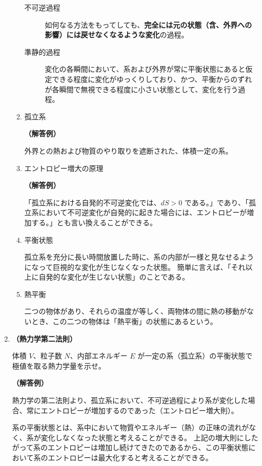 \documentclass[uplatex,dvipdfmx,a4paper,11pt]{jsarticle}
\begin{document}
\begin{appendix}
\begin{enumerate}
\begin{enumerate}
\begin{description}
\item[不可逆過程]
如何なる方法をもってしても、{\bf 完全には元の状態（含、外界への影響）には戻せなくなるような変化}の過程。

\item[準静的過程]
変化の各瞬間において、系および外界が常に平衡状態にあると仮定できる程度に変化がゆっくりしており、かつ、平衡からのずれが各瞬間で無視できる程度に小さい状態として、変化を行う過程。
\end{description}

\item
孤立系

{\bf （解答例）} 

外界との熱および物質のやり取りを遮断された、体積一定の系。

\item
エントロピー増大の原理

{\bf （解答例）} 

「孤立系における自発的不可逆変化では、$dS > 0$ である。」であり、「孤立系において不可逆変化が自発的に起きた場合には、エントロピーが増加する。」とも言い換えることができる。

\item
平衡状態

孤立系を充分に長い時間放置した時に、系の内部が一様と見なせるようになって巨視的な変化が生じなくなった状態。
簡単に言えば、「それ以上に自発的な変化が生じない状態」のことである。

\item
熱平衡

二つの物体があり、それらの温度が等しく、両物体の間に熱の移動がないとき、この二つの物体は「熱平衡」の状態にあるという。

\end{enumerate}


\item
{\bf （熱力学第二法則）}

体積 $V$、粒子数 $N$、内部エネルギー $E$ が一定の系（孤立系）の平衡状態で極値を取る熱力学量を示せ。

{\bf （解答例）}

熱力学の第二法則より、孤立系において、不可逆過程により系が変化した場合、常にエントロピーが増加するのであった（エントロピー増大則）。

系の平衡状態とは、系中において物質やエネルギー（熱）の正味の流れがなく、系が変化しなくなった状態と考えることができる。
上記の増大則にしたがって系のエントロピーは増加し続けてきたのであるから、この平衡状態において系のエントロピーは最大化すると考えることができる。


\end{enumerate}
\end{appendix}
\end{document}
